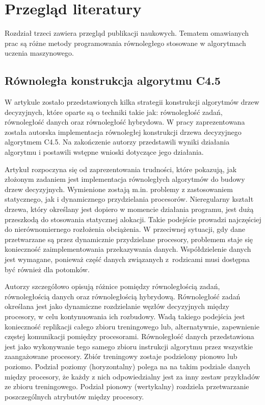 \documentclass[12pt]{article}
\begin{document}
\newpage

\section{Przegląd literatury}

Rozdział trzeci zawiera przegląd publikacji naukowych. Tematem omawianych prac są różne metody programowania równoległego stosowane
w algorytmach uczenia maszynowego.

\subsection{Równoległa konstrukcja algorytmu C4.5}

W artykule \cite{parallel-implementation-decision-tree} zostało przedstawionych kilka strategii konstrukcji algorytmów drzew decyzyjnych, które oparte są o techniki takie jak: równoległość zadań,
równoległość danych oraz równoległość hybrydowa. W pracy zaprezentowana została autorska implementacja równoległej konstrukcji drzewa
decyzyjnego algorytmem C4.5. Na zakończenie autorzy przedstawili wyniki działania algorytmu i postawili wstępne wnioski dotyczące jego działania.

Artykuł rozpoczyna się od zaprezentowania trudności, które pokazują, jak złożonym zadaniem jest implementacja równoległych
algorytmów do budowy drzew decyzyjnych. Wymienione zostają m.in. problemy z zastosowaniem statycznego, jak i dynamicznego przydzielania procesorów.
Nieregularny kształt drzewa, który określany jest dopiero w momencie działania programu, jest dużą przeszkodą do stosowania statycznej alokacji. Takie podejście prowadzi
najczęściej do nierównomiernego rozłożenia obciążenia. W przeciwnej sytuacji, gdy dane przetwarzane są przez dynamicznie przydzielane procesory, problemem staje się
konieczność zaimplementowania przekazywania danych. Współdzielenie danych jest wymagane, ponieważ część danych związanych z~rodzicami musi dostępna być również dla potomków.

Autorzy szczegółowo opisują różnice pomiędzy równoległością zadań, równoległością danych oraz równoległością hybrydową. Równoległość zadań określana jest
jako dynamiczne rozdzielanie węzłów decyzyjnych między procesory, w celu kontynuowania ich rozbudowy. Wadą takiego podejścia jest konieczność replikacji całego zbioru
treningowego lub, alternatywnie, zapewnienie częstej komunikacji pomiędzy procesorami. Równoległość danych przedstawiona jest jako wykonywanie tego samego zbioru instrukcji
algorytmu przez wszystkie zaangażowane procesory. Zbiór treningowy zostaje podzielony pionowo lub poziomo. Podział poziomy (horyzontalny) polega na na takim podziale danych między procesory, że
każdy z nich odpowiedzialny jest za inny zestaw przykładów ze zbioru treningowego. Podział pionowy (wertykalny) rozdziela przetwarzanie poszczególnych atrybutów między procesory.
\end{document}
